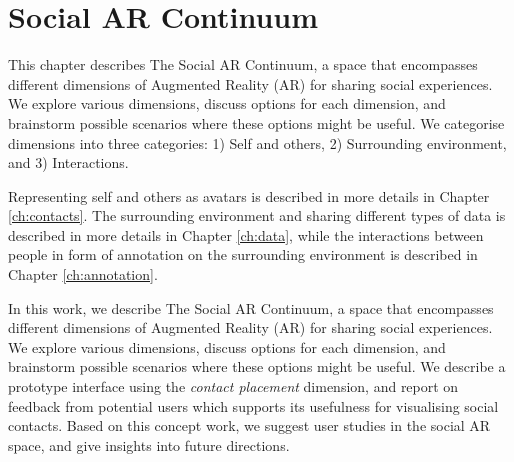 \chapter{Social AR Continuum} %
\label{ch:continuum} %

This chapter describes The Social AR Continuum, a space that encompasses different dimensions of Augmented Reality (AR) for sharing social experiences. We explore various dimensions, discuss options for each dimension, and brainstorm possible scenarios where these options might be useful. We categorise dimensions into three categories: 1) Self and others, 2) Surrounding environment, and 3) Interactions.

Representing self and others as avatars is described in more details in Chapter \ref{ch:contacts}. The surrounding environment and sharing different types of data is described in more details in Chapter \ref{ch:data}, while the interactions between people in form of annotation on the surrounding environment is described in Chapter \ref{ch:annotation}.




In this work, we describe The Social AR Continuum, a space that encompasses different dimensions of Augmented Reality (AR) for sharing social experiences. We explore various dimensions, discuss options for each dimension, and brainstorm possible scenarios where these options might be useful. We describe a prototype interface using the \textit{contact placement} dimension, and report on feedback from potential users which supports its usefulness for visualising social contacts. Based on this concept work, we suggest user studies in the social AR space, and give insights into future directions. 

